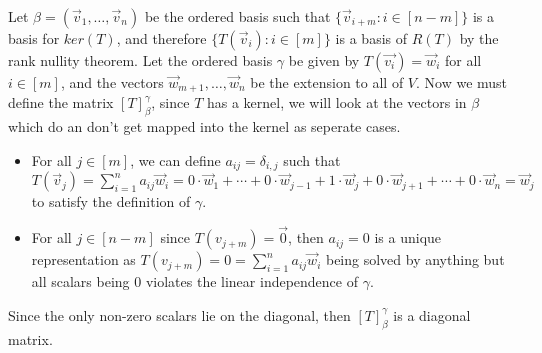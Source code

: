 \documentclass[12pt, letterpaper]{article}
\begin{document}
\begin{enumerate}
		Let $\beta = (\Vec{v}_1,\ldots,\Vec{v}_n)$ be the ordered basis such that $\{\Vec{v}_{i+m}: i\in [n-m]\}$ is a basis for $ker(T)$, and therefore $\{T(\Vec{v}_i) : i \in [m]\}$ is a basis of $R(T)$ by the rank nullity theorem.  Let the ordered basis $\gamma$ be given by $T(\Vec{v_i}) = \Vec{w}_i$ for all $i \in [m]$, and the vectors $\Vec{w}_{m+1},\ldots,\Vec{w}_n$ be the extension to all of $V$.  Now we must define the matrix $[T]_{\beta}^\gamma$, since $T$ has a kernel, we will look at the vectors in $\beta$ which do an don't get mapped into the kernel as seperate cases.  
		\begin{itemize}
			\item For all $j \in [m]$, we can define $a_{ij} = \delta_{i,j}$ such that $T(\Vec{v}_j) = \sum_{i = 1}^n a_{ij}\Vec{w}_i = 0 \cdot \Vec{w}_1 + \cdots + 0 \cdot \Vec{w}_{j-1} + 1 \cdot \Vec{w}_j +  0 \cdot \Vec{w}_{j+1} + \cdots + 0 \cdot \Vec{w}_n = \Vec{w}_j$ to satisfy the definition of $\gamma$.
			\item For all $j \in [n-m]$ since $T(v_{j+m}) = \Vec{0}$, then $a_{ij} = 0$ is a unique representation as $T(v_{j+m})= 0 =\sum_{i=1}^n a_{ij}\Vec{w}_i$  being solved by anything but all scalars being $0$ violates the linear independence of $\gamma$. 
		\end{itemize}
		Since the only non-zero scalars lie on the diagonal, then $[T]_\beta^\gamma$ is a diagonal matrix.  
		
		  
\end{enumerate}
\end{document}

